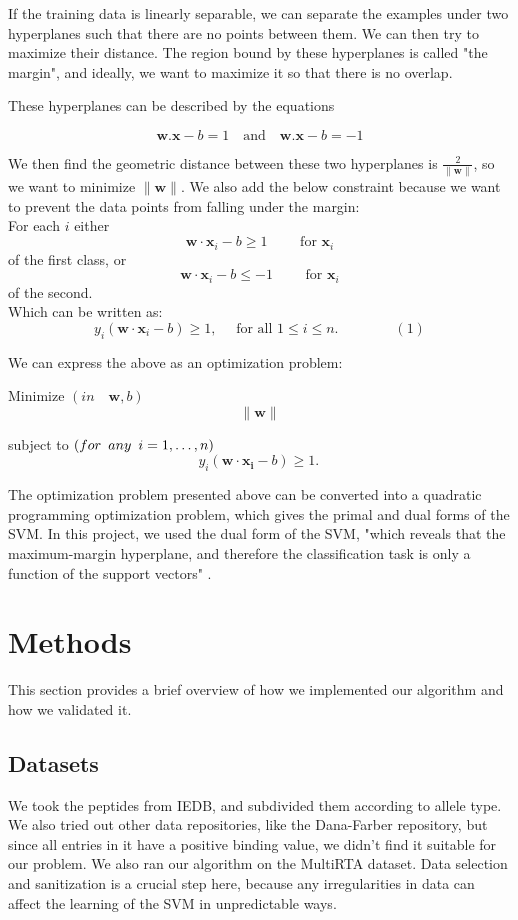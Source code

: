 \documentclass[journal]{IEEEtran}
\begin{document}
If the training data is linearly separable, we can separate the examples under two hyperplanes such that there are no points between them. We can then try to maximize their distance. The region bound by these hyperplanes is called "the margin", and ideally, we want to maximize it so that there is no overlap.

These hyperplanes can be described by the equations


$$
    \mathbf{w}.\mathbf{x} - b = 1    \quad \textrm{and} \quad 
    \mathbf{w}.\mathbf{x} - b = -1
$$

We then find the geometric distance between these two hyperplanes is $\tfrac{2}{\|\mathbf{w}\|}$, so we want to minimize $\|\mathbf{w}\|$. We also add the below constraint because we want to prevent the data points from falling under the margin:\\ 

For each $i$ either
$$\mathbf{w}\cdot\mathbf{x}_i - b \ge 1\qquad\text{ for }\mathbf{x}_i$$ 
of the first class, or
$$\mathbf{w}\cdot\mathbf{x}_i - b \le -1\qquad\text{ for }\mathbf{x}_i$$ 
of the second.  \\  

Which can be written as:
$$
    y_i(\mathbf{w}\cdot\mathbf{x}_i - b) \ge 1, \quad \text{ for all } 1 \le i \le n.\qquad\qquad(1)
$$

We can express the above as an optimization problem:

Minimize $(in \quad {\mathbf{w},b})$
$$   
 \|\mathbf{w}\|
$$
 
subject to $(for \enskip any \enskip i = 1, \dots, n)$
$$
y_i(\mathbf{w}\cdot\mathbf{x_i} - b) \ge 1. \,
$$

The optimization problem presented above can be converted into a quadratic programming optimization problem, which gives the primal and dual forms of the SVM. In this project, we used the dual form of the SVM, "which reveals that the maximum-margin hyperplane, and therefore the classification task is only a function of the support vectors" \cite{WikipediaSVM}.


\section{Methods}
This section provides a brief overview of how we implemented our algorithm and how we validated it.

\subsection{Datasets}
We took the peptides from IEDB, and subdivided them according to allele type. We also tried out other data repositories, like the Dana-Farber \cite{DanaFarber} repository, but since all entries in it have a positive binding value, we didn't find it suitable for our problem. We also ran our algorithm on the MultiRTA \cite{MultiRTA} dataset. Data selection and sanitization is a crucial step here, because any irregularities in data can affect the learning of the SVM in unpredictable ways.
\end{document}
